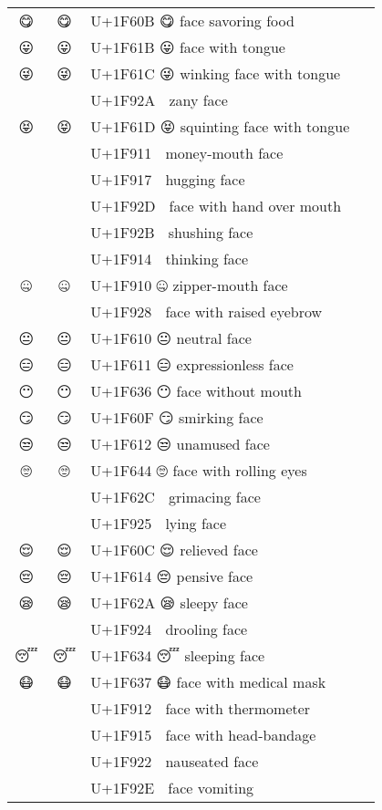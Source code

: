 \documentclass[a4paper,12pt]{article}
\newcommand{\fontA}[1]{{\fontspec[RawFeature={mode=harf,+dist,+ccmp}]{Segoe UI Emoji} #1}}
\newcommand{\fontB}[1]{{\fontspec[RawFeature={mode=harf,+dist,+ccmp}]{Noto Color Emoji} #1}}
\begin{document}
\begin{longtable}[c]{ccp{0.8\linewidth}}
\fontA{😋}&\fontB{😋}&U+1F60B 😋 face savoring food\\
\fontA{😛}&\fontB{😛}&U+1F61B 😛 face with tongue\\
\fontA{😜}&\fontB{😜}&U+1F61C 😜 winking face with tongue\\
\fontA{🤪}&\fontB{🤪}&U+1F92A 🤪 zany face\\
\fontA{😝}&\fontB{😝}&U+1F61D 😝 squinting face with tongue\\
\fontA{🤑}&\fontB{🤑}&U+1F911 🤑 money-mouth face\\
\fontA{🤗}&\fontB{🤗}&U+1F917 🤗 hugging face\\
\fontA{🤭}&\fontB{🤭}&U+1F92D 🤭 face with hand over mouth\\
\fontA{🤫}&\fontB{🤫}&U+1F92B 🤫 shushing face\\
\fontA{🤔}&\fontB{🤔}&U+1F914 🤔 thinking face\\
\fontA{🤐}&\fontB{🤐}&U+1F910 🤐 zipper-mouth face\\
\fontA{🤨}&\fontB{🤨}&U+1F928 🤨 face with raised eyebrow\\
\fontA{😐}&\fontB{😐}&U+1F610 😐 neutral face\\
\fontA{😑}&\fontB{😑}&U+1F611 😑 expressionless face\\
\fontA{😶}&\fontB{😶}&U+1F636 😶 face without mouth\\
\fontA{😏}&\fontB{😏}&U+1F60F 😏 smirking face\\
\fontA{😒}&\fontB{😒}&U+1F612 😒 unamused face\\
\fontA{🙄}&\fontB{🙄}&U+1F644 🙄 face with rolling eyes\\
\fontA{😬}&\fontB{😬}&U+1F62C 😬 grimacing face\\
\fontA{🤥}&\fontB{🤥}&U+1F925 🤥 lying face\\
\fontA{😌}&\fontB{😌}&U+1F60C 😌 relieved face\\
\fontA{😔}&\fontB{😔}&U+1F614 😔 pensive face\\
\fontA{😪}&\fontB{😪}&U+1F62A 😪 sleepy face\\
\fontA{🤤}&\fontB{🤤}&U+1F924 🤤 drooling face\\
\fontA{😴}&\fontB{😴}&U+1F634 😴 sleeping face\\
\fontA{😷}&\fontB{😷}&U+1F637 😷 face with medical mask\\
\fontA{🤒}&\fontB{🤒}&U+1F912 🤒 face with thermometer\\
\fontA{🤕}&\fontB{🤕}&U+1F915 🤕 face with head-bandage\\
\fontA{🤢}&\fontB{🤢}&U+1F922 🤢 nauseated face\\
\fontA{🤮}&\fontB{🤮}&U+1F92E 🤮 face vomiting\\

\end{longtable}
\end{document}
